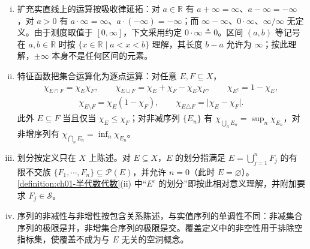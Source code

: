 \documentclass[../../main.tex]{subfiles}%
\begin{document}
\begin{remark}\label{remark:ch01-集合记号}
\begin{enumerate}[(i)]
\item 扩充实直线上的运算按吸收律延拓：对 $a\in\mathbb{R}$ 有 $a+\infty=\infty$、$a-\infty=-\infty$，对 $a>0$ 有 $a\cdot\infty=\infty$、$a\cdot(-\infty)=-\infty$；而 $\infty-\infty$、$0\cdot\infty$、$\infty/\infty$ 无定义。由于测度取值于 $[0,\infty]$，下文采用约定 $0\cdot\infty\triangleq0$。区间 $(a,b)$ 等记号在 $a,b\in\overline{\mathbb{R}}$ 时按 $\{x\in\mathbb{R}\mid a<x<b\}$ 理解，其长度 $b-a$ 允许为 $\infty$；按此理解，$\pm\infty$ 本身不是任何区间的元素。
\item 特征函数把集合运算化为逐点运算：对任意 $E,F\subseteq X$，
\begin{align*}
\chi_{E\cap F}=\chi_E\chi_F,\qquad
\chi_{E\cup F}=\chi_E+\chi_F-\chi_E\chi_F,\qquad
\chi_{E^c}=1-\chi_E,
\end{align*}
\begin{align*}
\chi_{E\setminus F}=\chi_E(1-\chi_F),\qquad
\chi_{E\triangle F}=\lvert\chi_E-\chi_F\rvert.
\end{align*}
此外 $E\subseteq F$ 当且仅当 $\chi_E\leqslant\chi_F$；对非减序列 $\{E_n\}$ 有 $\chi_{\bigcup_nE_n}=\sup_n\chi_{E_n}$，对非增序列有 $\chi_{\bigcap_nE_n}=\inf_n\chi_{E_n}$。
\item 划分按定义只在 $X$ 上陈述。对 $E\subseteq X$，$E$ 的划分指满足 $E=\bigcup_{j=1}^nF_j$ 的有限不交族 $\{F_1,\cdots,F_n\}\subseteq\mathcal{P}(E)$，并允许 $n=0$（此时 $E=\varnothing$）。\cref{definition:ch01-半代数代数}(ii) 中“$E^c$ 的划分”即按此相对意义理解，并附加要求 $F_j\in\mathcal{S}$。
\item 序列的非减性与非增性按包含关系陈述，与实值序列的单调性不同：非减集合序列的极限是并，非增集合序列的极限是交。覆盖定义中的非空性用于排除空指标集，使覆盖不成为与 $E$ 无关的空洞概念。
\end{enumerate}
\end{remark}
\end{document}
